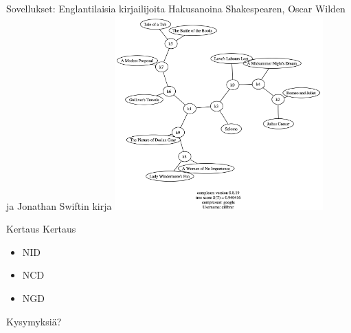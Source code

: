 \documentclass{beamer}
\begin{document}
\begin{frame}{Sovellukset: Englantilaisia kirjailijoita}
  Hakusanoina Shakespearen, Oscar Wilden ja Jonathan Swiftin kirja
  \centering
  \includegraphics[width=8cm,keepaspectratio=true]{google-002}
\end{frame}

\begin{frame}{Kertaus}
  Kertaus
  \begin{itemize}
    \item NID
    \item NCD
    \item NGD
  \end{itemize}
\end{frame}

\begin{frame}
  \centering
  Kysymyksiä?
\end{frame}
\end{document}
